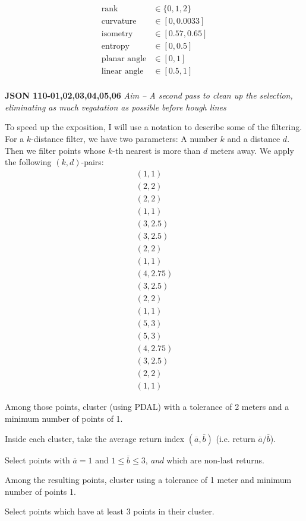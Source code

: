 \documentclass[a4paper,11pt,twoside]{article}
\theoremstyle{definition}
\theoremstyle{remark}
\begin{document}
\begin{list}{}{}
\begin{align*}
\text{rank}&\in\{0,1,2\}\\
\text{curvature}&\in[0,0.0033]\\
\text{isometry}&\in [0.57,0.65]\\
\text{entropy}&\in[0,0.5]\\
\text{planar angle}&\in [0,1]\\
\text{linear angle}&\in [0.5,1]\\
\end{align*}
\item \textbf{JSON 110-01,02,03,04,05,06}
\emph{Aim -- A second pass to clean up the selection, eliminating as much vegatation as possible before hough lines}
\item To speed up the exposition, I will use a notation to describe some of the filtering. For a $k$-distance filter, we have two parameters: A number $k$ and a distance $d$. Then we filter points whose $k$-th nearest is more than $d$ meters away. We apply the following $(k,d)$-pairs: 
\begin{align*}
(1,1)\\(2,2)\\(2,2)\\(1,1)\\(3,2.5)\\(3,2.5)\\(2,2)\\(1,1)\\(4,2.75)\\(3,2.5)\\(2,2)\\(1,1)\\(5,3)\\(5,3)\\(4,2.75)\\(3,2.5)\\(2,2)\\(1,1)
\end{align*}
\item Among those points, cluster (using PDAL) with a tolerance of 2 meters and a minimum number of points of 1.
\item Inside each cluster, take the average return index $(\overline a,\overline b)$ (i.e. return $\overline a/\overline b$).
\item Select points with $\overline a=1$ and $1\leqslant \overline b\leqslant 3$, \emph{and} which are non-last returns.
\item Among the resulting points, cluster using a tolerance of 1 meter and minimum number of points 1.
\item Select points which have at least 3 points in their cluster.

\end{list}
\end{document}
